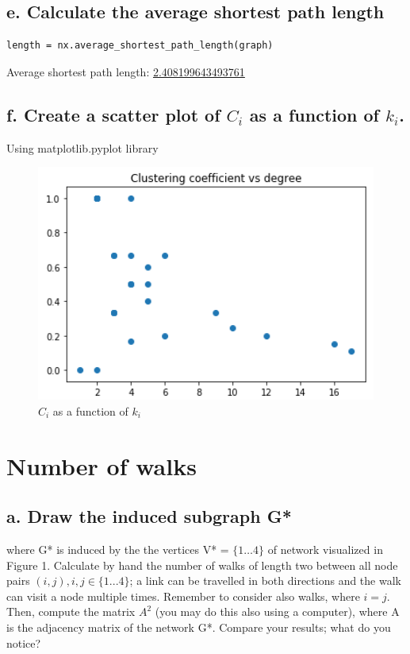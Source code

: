 \documentclass[a4paper,12pt]{article}
\begin{document}
\subsection*{e. Calculate the average shortest path length}
\begin{lstlisting}
length = nx.average_shortest_path_length(graph)
\end{lstlisting}
Average shortest path length: \underline{2.408199643493761}

\subsection*{f. Create a scatter plot of $C_i$ as a function of $k_i$.}
Using matplotlib.pyplot library
\begin{figure}[h!]
	\begin{center}
    \includegraphics[scale=0.8]{graph_scatter.PNG}
    \caption{$C_i$ as a function of $k_i$}
	\end{center}
\end{figure}

\section{Number of walks}

\subsection*{a. Draw the induced subgraph G*}
where G* is induced by the the vertices V* = $\{1…4\}$ of network visualized in Figure 1. Calculate by hand the number of walks of length two between all node pairs $(i,j), i, j \in \{1...4\}$; a link can be travelled in both directions and the walk can visit a node multiple times. Remember to consider also walks, where $i = j$. Then, compute the matrix $A^2$ (you may do this also using a computer), where A is the adjacency matrix of the network G*. Compare your results; what do you notice? 
\end{document}

